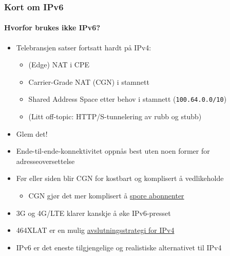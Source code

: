 \begin{frame}%
  \frametitle{Kort om IPv6}
  \framesubtitle{Hvorfor brukes ikke IPv6?}
  \begin{itemize}%
  \item Telebransjen satser fortsatt hardt på IPv4:
    \begin{itemize}%
    \item (Edge) NAT i CPE\hfill{}
    \item Carrier-Grade NAT (CGN) i stamnett\hfill{}
    \item Shared Address Space etter behov i stamnett (\texttt{100.64.0.0/10})\hfill{}
    \item (Litt off-topic: HTTP/S-tunnelering av rubb og stubb)
    \end{itemize}
  \item Glem det!
  \item Ende-til-ende-konnektivitet oppnås best uten noen former for
    adresseoversettelse
  \item Før eller siden blir CGN for kostbart og komplisert å vedlikeholde
    \begin{itemize}%
    \item CGN gjør det mer komplisert å
      \href{http://www.nyteknik.se/nyheter/it_telekom/allmant/article3904264.ece}{spore
        abonnenter}
    \end{itemize}
  \item 3G og 4G/LTE klarer kanskje å øke IPv6-presset\hfill{}
  \item 464XLAT er en mulig
    \href{https://conference.apnic.net/data/37/464xlat-apricot-2014_1393236641.pdf}{avslutningsstrategi
      for IPv4}\hfill{}
  \item \alert<2>{IPv6 er det eneste tilgjengelige og realistiske alternativet til IPv4}
  \end{itemize}
\end{frame}

